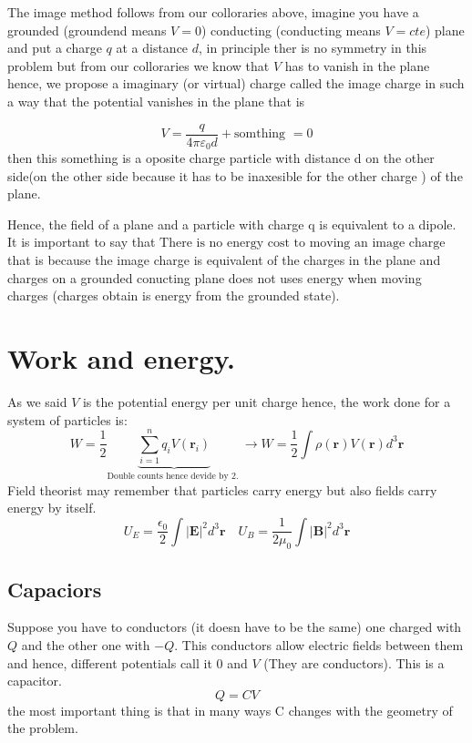 The image method follows from our colloraries above, imagine you have a grounded  (groundend means $V=0$) conducting (conducting means $V=cte$) plane and put a charge $q$ at a distance $d$, in principle ther is 
no symmetry in this problem but from our colloraries we know that $V$ has to vanish in the plane hence,  we propose a imaginary (or virtual) charge called the image charge in such a way that the potential vanishes in the plane that is 

$$V=\frac{q}{4\pi \varepsilon_0 d}+\text{
   somthing 
}=0 $$ then this something is a oposite charge particle with distance d on the other side(on the other side because it has to be {inaxesible
 for the other charge
}) of the plane.

Hence, the field of a plane and a particle with charge q is equivalent to a dipole. It is important to say that $\boxed{\text{
   There is no energy cost to moving an image charge 
}}$ that is because the image charge is equivalent of the charges in the plane and charges on a grounded conucting plane does not uses energy when moving charges (charges obtain is energy from the grounded state).


\section{Work and energy.}
As we said $V$ is the potential energy per unit charge hence, the work done for a system of particles is:
$$\boxed{W=\frac{1}{2} \underbrace{\sum_{i=1}^{n} q_{i} V\left(\mathbf{r}_{i}\right)}_{
   \text{
      Double counts hence devide by 2. 
   } 
}} \rightarrow W=\frac{1}{2} \int \rho(\mathbf{r}) V(\mathbf{r}) d^{3} \mathbf{r}$$
Field theorist may remember that particles carry energy but also fields carry energy by itself. $$\boxed{U_{E}=\frac{\epsilon_{0}}{2} \int|\mathbf{E}|^{2} d^{3} \mathbf{r} \quad U_{B}=\frac{1}{2 \mu_{0}} \int|\mathbf{B}|^{2} d^{3} \mathbf{r}}$$

\subsection{Capaciors}
Suppose you have to conductors (it doesn have to be the same) one charged with $Q$ and the other one with $-Q$. This conductors allow electric fields between them and hence, different potentials call it $0$ and $V$ (They are conductors).
This is a capacitor. $$\boxed{Q=CV}$$ the most important thing is that in many ways C changes with the geometry of the problem.


